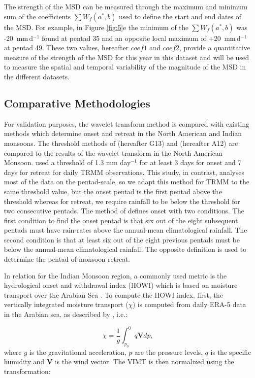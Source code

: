 The strength of the MSD can be measured through the maximum and minimum sum of the coefficients $\sum W_f(a^*,b)$ used to define the start and end dates of the MSD.
For example, in Figure \ref{fig:5}e the minimum of the $\sum W_f(a^*,b)$ was -20\ mm\,d$^{-1}$ found at pentad 35 and an opposite local maximum of +20\ mm\,d$^{-1}$ at pentad 49. These two values, hereafter $coef1$ and $coef2$, provide a quantitative measure of the strength of the MSD for this year in this dataset and will be used to measure the spatial and temporal variability of the magnitude of the MSD in the different datasets.

\subsection{Comparative Methodologies}


For validation purposes, the wavelet transform method is compared with existing methods which determine onset and retreat in the North American and Indian monsoons. 
The threshold methods of \cite{geil2013} (hereafter G13) and \cite{arias2012} (hereafter A12) are compared to the results of the wavelet transform in the North American Monsoon.
 used a threshold of 1.3 mm day$^{-1}$ for at least 3 days for onset and 7 days for retreat for daily TRMM observations. This study, in contrast, analyses most of the data on the pentad-scale, so we adapt this method for TRMM to the same threshold value, but the onset pentad is the first pentad above the threshold whereas for retreat, we require rainfall to be below the threshold for two consecutive pentads.
 The method of  defines onset with two conditions. The first condition to find the onset pentad is that six out of the eight subsequent pentads must have rain-rates above the annual-mean climatological rainfall. The second condition is that at least six out of the eight previous pentads must be below the annual-mean climatological rainfall.
The opposite definition is used to determine the pentad of monsoon retreat. 

In relation for the Indian Monsoon region, a commonly used metric is the hydrological onset and withdrawal index (HOWI) which is based on moisture transport over the Arabian Sea \citep{fasullo2003,Sahana_2015,chevuturi2019}.
To compute the HOWI index, first, the vertically integrated moisture transport ($\chi$) is computed from daily ERA-5 data in the Arabian sea, as described by \cite{fasullo2003}, i.e.:

\begin{equation}
\chi=\frac{1}{g}\int_{p_0}^0 q \mathbf{V} dp,
\end{equation}
 \noindent where $g$ is the gravitational acceleration, $p$ are the pressure levels, $q$ is the specific humidity and $\mathbf{V}$ is the wind vector. The VIMT is then normalized using the transformation:

